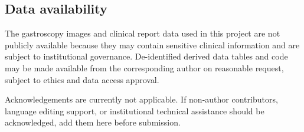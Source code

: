 \documentclass[Afour,sagev,times]{sagej}
\begin{document}
\subsection*{Data availability}
The gastroscopy images and clinical report data used in this project are not publicly available because they may contain sensitive clinical information and are subject to institutional governance. De-identified derived data tables and code may be made available from the corresponding author on reasonable request, subject to ethics and data access approval.

\begin{acks}
Acknowledgements are currently not applicable. If non-author contributors, language editing support, or institutional technical assistance should be acknowledged, add them here before submission.
\end{acks}
\end{document}
